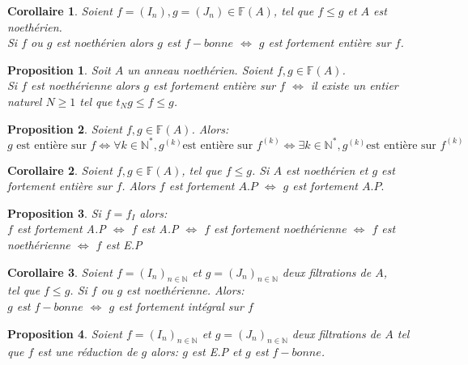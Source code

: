\documentclass[12pt, a4paper, oneside]{book}
\newtheorem{maproposition}{Proposition}[chapter]
\newtheorem{moncorollaire}{Corollaire}[chapter]
\begin{document}
\begin{moncorollaire}
	Soient $f=(I_n), g=(J_n) \in \mathbb{F}(A)$, tel que $f \leqslant g$ et $A$ est noethérien.\\ Si $f$ ou $g$ est noethérien alors $g$ est $f-bonne$ $\Longleftrightarrow$ $g$ est fortement entière sur $f$.
\end{moncorollaire}
\begin{maproposition}
	Soit $A$ un anneau noethérien. Soient $f,g \in \mathbb{F}(A)$.\\ Si $f$ est noethérienne alors $g$ est fortement entière sur $f$ $\Longleftrightarrow$ il existe un entier naturel $N \geqslant 1$ tel que $t_{N}g \leqslant f \leqslant g$.
\end{maproposition}
\begin{maproposition}
	Soient $f,g \in \mathbb{F}(A)$. Alors:
	\[ g \text{ est entière sur } f \Longleftrightarrow \forall k \in \mathbb{N}^{*}, g^{(k)} \text{est entière sur } f^{(k)} \Longleftrightarrow \exists k \in \mathbb{N}^{*}, g^{(k)} \text{est entière sur } f^{(k)} \]
\end{maproposition}

\begin{moncorollaire}
	Soient $f,g \in \mathbb{F}(A)$, tel que $f \leqslant g$. Si $A$ est noethérien et $g$ est fortement entière sur $f$. Alors $f$ est fortement $A.P$ $\Longleftrightarrow$ $g$ est fortement $A.P.$
\end{moncorollaire}
\begin{maproposition}
	Si $f=f_I$ alors:\\
	$f$ est fortement A.P $\Longleftrightarrow $ $f$ est A.P $\Longleftrightarrow $ $f$ est fortement noethérienne $\Longleftrightarrow $ $f$ est noethérienne $\Longleftrightarrow $ $f$ est E.P
\end{maproposition}

\begin{moncorollaire}
	Soient $f=(I_n)_{n \in \mathbb{N}}$ et $g=(J_n)_{n \in \mathbb{N}}$ deux filtrations de $A$,\\ tel que $f \leqslant  g$.
	Si $f$ ou $g$ est noethérienne. Alors: \\
	$g$ est $f-bonne$ $\Longleftrightarrow $ $g$ est fortement intégral sur $f$
\end{moncorollaire}
\begin{maproposition}
	Soient $f=(I_n)_{n \in \mathbb{N}}$ et $g=(J_n)_{n \in \mathbb{N}}$ deux filtrations de $A$ tel que $f$ est une réduction de $g$ alors:	$g$ est E.P et $g$ est $f-bonne$.
\end{maproposition}
\end{document}
